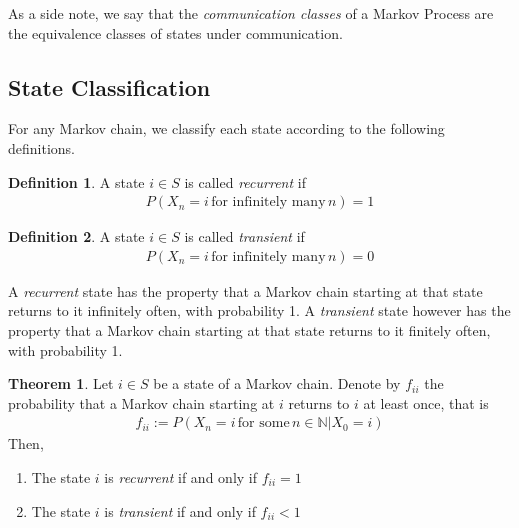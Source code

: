 \documentclass[a4paper,12pt]{article}
\theoremstyle{definition}
\newtheorem{definition}{Definition}[subsection]
\newtheorem{theorem}{Theorem}[subsection]
\newcommand{\N}{\mathbb{N}}
\begin{document}
	As a side note, we say that the \emph{communication classes} of a Markov Process are the equivalence classes of states under communication.
	\newpage	

	\subsection{State Classification}
	
	For any Markov chain, we classify each state according to the following definitions.
	\begin{definition}
		A state $i \in S$ is called \emph{recurrent} if 
		\begin{equation*}
			\begin{aligned}
				P(X_n = i \, \text{for infinitely many} \, n) = 1
			\end{aligned}
		\end{equation*}
	\end{definition}
	\begin{definition}
		A state $i \in S$ is called \emph{transient} if 
		\begin{equation*}
			\begin{aligned}
				P(X_n = i \, \text{for infinitely many} \, n) = 0
			\end{aligned}
		\end{equation*}
	\end{definition}

	A \emph{recurrent} state has the property that a Markov chain starting at that state returns to it infinitely often, with probability 1.
	A \emph{transient} state however has the property that a Markov chain starting at that state returns to it finitely often, with probability 1.

	\begin{theorem}
		Let $i \in S$ be a state of a Markov chain. Denote by $f_{ii}$ the probability that a Markov chain starting at $i$ returns to 
		$i$ at least once, that is
		\begin{equation*}
			\begin{aligned}
				f_{ii} := P(X_n = i \, \text{for some} \, n \in \N | X_0 = i)
			\end{aligned}
		\end{equation*}
		Then,
		\begin{enumerate}
			\item The state $i$ is \emph{recurrent} if and only if $f_{ii} = 1$
			\item The state $i$ is \emph{transient} if and only if $f_{ii} < 1$
		\end{enumerate}
	\end{theorem}
\end{document}
